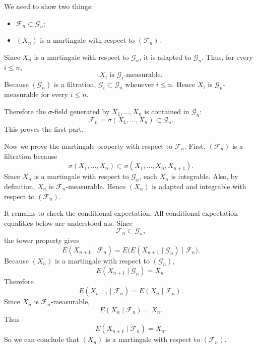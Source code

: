 \documentclass[a4paper,12pt,openany]{article}
\theoremstyle{plain}
\theoremstyle{definition}
\begin{document}
\medskip

We need to show two things:
\begin{itemize}
\item $\mathcal{F}_n\subset \mathcal{G}_n$;
\item $(X_n)$ is a martingale with respect to $(\mathcal{F}_n)$.
\end{itemize}

\medskip

Since $X_n$ is a martingale with respect to $\mathcal{G}_n$, it is adapted to $\mathcal{G}_n$. Thus, for every $i\le n$,
\[
X_i \text{ is } \mathcal{G}_i\text{-measurable}.
\]
Because $(\mathcal{G}_n)$ is a filtration, $\mathcal{G}_i\subset \mathcal{G}_n$ whenever $i\le n$. Hence $X_i$ is $\mathcal{G}_n$-measurable for every $i\le n$.

Therefore the $\sigma$-field generated by $X_1,\ldots,X_n$ is contained in $\mathcal{G}_n$:
\[
\mathcal{F}_n
=
\sigma(X_1,\ldots,X_n)
\subset
\mathcal{G}_n.
\]
This proves the first part.

\medskip

Now we prove the martingale property with respect to $\mathcal{F}_n$. First, $(\mathcal{F}_n)$ is a filtration because
\[
\sigma(X_1,\ldots,X_n)
\subset
\sigma(X_1,\ldots,X_n,X_{n+1}).
\]
Since $X_n$ is a martingale with respect to $\mathcal{G}_n$, each $X_n$ is integrable. Also, by definition, $X_n$ is $\mathcal{F}_n$-measurable. Hence $(X_n)$ is adapted and integrable with respect to $(\mathcal{F}_n)$.

It remains to check the conditional expectation. All conditional expectation equalities below are understood a.s. Since
\[
\mathcal{F}_n\subset \mathcal{G}_n,
\]
the tower property gives
\[
E(X_{n+1}\mid\mathcal{F}_n)
=
E\bigl(E(X_{n+1}\mid\mathcal{G}_n)\mid\mathcal{F}_n\bigr).
\]
Because $(X_n)$ is a martingale with respect to $(\mathcal{G}_n)$,
\[
E(X_{n+1}\mid\mathcal{G}_n)=X_n.
\]
Therefore
\[
E(X_{n+1}\mid\mathcal{F}_n)
=
E(X_n\mid\mathcal{F}_n).
\]
Since $X_n$ is $\mathcal{F}_n$-measurable,
\[
E(X_n\mid\mathcal{F}_n)=X_n.
\]
Thus
\[
E(X_{n+1}\mid\mathcal{F}_n)=X_n.
\]
So we can conclude that $(X_n)$ is a martingale with respect to $(\mathcal{F}_n)$.
\end{document}
